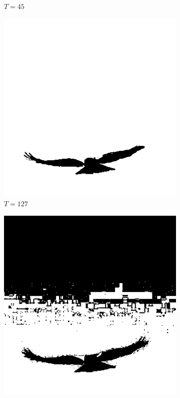 \begin{figure}[H]
\begin{subfigure}[b]{0.3\textwidth}
         \caption{$T = 45$}
         \label{subfig:ThresholdExample2_p2}
     \end{subfigure}
     \hfill
     \begin{subfigure}[b]{0.3\textwidth}
         \centering
         \includegraphics[width=1\textwidth]{8Misc/Pictures/Introduction/img_threshold_p2.jpg}
         \caption{$T = 127$}
         \label{subfig:ThresholdExample2_p3}
     \end{subfigure}
     \hfill
     \begin{subfigure}[b]{0.3\textwidth}
         \centering
         \includegraphics[width=1\textwidth]{8Misc/Pictures/Introduction/img_threshold_p3.jpg}

\end{subfigure}
\end{figure}
